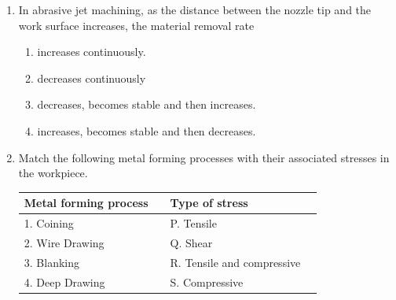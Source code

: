 \documentclass[journal,11pt,onecolumn]{IEEEtran}
\begin{document}
\begin{enumerate}

    \item In abrasive jet machining, as the distance between the nozzle tip and the work surface increases, the material removal rate

          \begin{enumerate}
              \item increases continuously.
              \item decreases continuously
              \item decreases, becomes stable and then increases.
              \item increases, becomes stable and then decreases.
          \end{enumerate}

    \item Match the following metal forming processes with their associated stresses in the workpiece.

          \begin{table}[H]
              \centering
              \begin{tabular}{|l|l|l|l|}
                  \hline
                  \textbf{Metal forming process} &  & \textbf{Type of stress}    & \\
                  \hline
                  1. Coining                     &  & P. Tensile                 & \\
                  2. Wire Drawing                &  & Q. Shear                   & \\
                  3. Blanking                    &  & R. Tensile and compressive & \\
                  4. Deep Drawing                &  & S. Compressive             & \\
                  \hline
              \end{tabular}
          \end{table}

          \begin{enumerate}
          \end{enumerate}


\end{enumerate}
\end{document}
